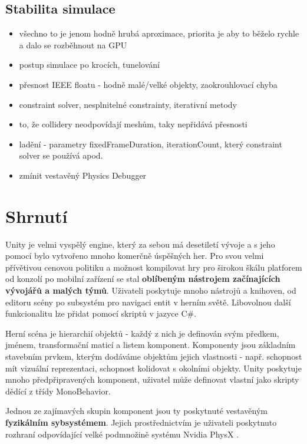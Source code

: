 \subsection{Stabilita simulace}
\begin{itemize}
    \item všechno to je jenom hodně hrubá aproximace, priorita je aby to běželo rychle a dalo se rozběhnout na GPU
    \item postup simulace po krocích, tunelování
    \item přesnost IEEE floatu - hodně malé/velké objekty, zaokrouhlovací chyba
    \item constraint solver, nesplnitelné constrainty, iterativní metody
    \item to, že collidery neodpovídají meshům, taky nepřidává přesnosti
    \item ladění - parametry fixedFrameDuration, iterationCount, který constraint solver se používá apod.
    \item zmínit vestavěný Physics Debugger
\end{itemize}


\section{Shrnutí}

Unity je velmi vyspělý engine, který za sebou má desetiletí vývoje a s jeho pomocí bylo vytvořeno mnoho komerčně úspěšných her. Pro svou velmi přívětivou cenovou politiku a možnost kompilovat hry pro širokou škálu platforem od konzolí po mobilní zařízení se stal \textbf{oblíbeným nástrojem začínajících vývojářů a malých týmů}. Uživateli poskytuje mnoho nástrojů a knihoven, od editoru scény po subsystém pro navigaci entit v herním světě. Libovolnou další funkcionalitu lze přidat pomocí skriptů v jazyce C\#. 

Herní scéna je hierarchií objektů - každý z nich je definován svým předkem, jménem, transformační maticí a listem komponent. Komponenty jsou základním stavebním prvkem, kterým dodáváme objektům jejich vlastnosti - např. schopnost mít vizuální reprezentaci, schopnost kolidovat s okolními objekty. Unity poskytuje mnoho předpřipravených komponent, uživatel může definovat vlastní jako skripty dědící z třídy MonoBehavior.

Jednou ze zajímavých skupin komponent jsou ty poskytnuté vestavěným \textbf{fyzikálním sybsystémem}. Jejich prostřednictvím je uživateli poskytnuto rozhraní odpovídající velké podmnožině systému Nvidia PhysX \cite{PhysX}. 

